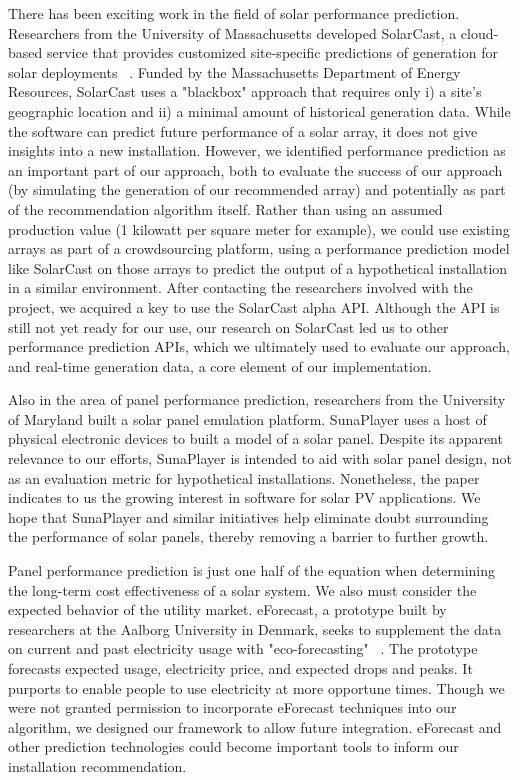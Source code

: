 \documentclass[pageno]{jpaper}
\begin{document}
There has been exciting work in the field of solar performance prediction. Researchers from the University of Massachusetts developed SolarCast, a cloud-based service that provides customized site-specific predictions of generation for solar deployments ~\cite{Iyengar:2014:SCB:2674061.2674071}. Funded by the Massachusetts Department of Energy Resources, SolarCast uses a "blackbox" approach that requires only i) a site's geographic location and ii) a minimal amount of historical generation data. While the software can predict future performance of a solar array, it does not give insights into a new installation. However, we identified performance prediction as an important part of our approach, both to evaluate the success of our approach (by simulating the generation of our recommended array) and potentially as part of the recommendation algorithm itself. Rather than using an assumed production value (1 kilowatt per square meter for example), we could use existing arrays as part of a crowdsourcing platform, using a performance prediction model like SolarCast on those arrays to predict the output of a hypothetical installation in a similar environment. After contacting the researchers involved with the project, we acquired a key to use the SolarCast alpha API. Although the API is still not yet ready for our use, our research on SolarCast led us to other performance prediction APIs, which we ultimately used to evaluate our approach, and real-time generation data, a core element of our implementation.

Also in the area of panel performance prediction, researchers from the University of Maryland built a solar panel emulation platform. SunaPlayer \cite{Bobovych:2015:SHE:2737095.2737110} uses a host of physical electronic devices to built a model of a solar panel. Despite its apparent relevance to our efforts, SunaPlayer is intended to aid with solar panel design, not as an evaluation metric for hypothetical installations. Nonetheless, the paper indicates to us the growing interest in software for solar PV applications. We hope that SunaPlayer and similar initiatives help eliminate doubt surrounding the performance of solar panels, thereby removing a barrier to further growth.

Panel performance prediction is just one half of the equation when determining the long-term cost effectiveness of a solar system. We also must consider the expected behavior of the utility market. eForecast, a prototype built by researchers at the Aalborg University in Denmark, seeks to supplement the data on current and past electricity usage with "eco-forecasting" ~\cite{Kjeldskov:2015:EDE:2702123.2702318}. The prototype forecasts expected usage, electricity price, and expected drops and peaks. It purports to enable people to use electricity at more opportune times. Though we were not granted permission to incorporate eForecast techniques into our algorithm, we designed our framework to allow future integration. eForecast and other prediction technologies could become important tools to inform our installation recommendation. \newline
\end{document}
